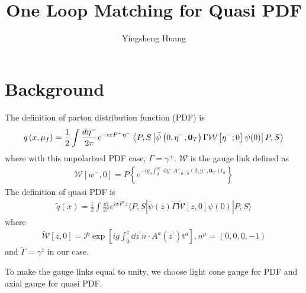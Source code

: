\documentclass{article}
\title{One Loop Matching for Quasi PDF}
\author{Yingsheng Huang}
\begin{document}
\maketitle
\section{Background}
The definition of parton distribution function (PDF) is
\begin{align}
	q\left(x, \mu_{f}\right)=\frac{1}{2} \int \frac{d \eta^{-}}{2 \pi} e^{-i x P^{+} \eta^{-}}\left\langle P, S\left|\bar{\psi}\left(0,\eta^{-},\vb{0}_{T}\right) \Gamma \mathcal{W}\left[\eta^{-} ; 0\right] \psi(0)\right| P, S\right\rangle
\end{align}
where with this unpolarized PDF case, $\Gamma=\gamma^+$. $\mathcal{W}$ is the gauge link defined as\cite{Collins2009}
\begin{align}
	\mathcal{W}\left[w^{-}, 0\right]=P\left\{e^{-i g_{0} \int_{0}^{w^{-}} \mathrm{d} y^{-} A_{(0) \sigma}^{+}\left(0, y^{-}, \boldsymbol{0}_{\mathrm{T}}\right) t_{\sigma}}\right\}
\end{align}
The definition of quasi PDF is
\begin{align}
	\tilde{q}(x)=\frac{1}{2} \int \frac{\dd z}{2 \pi} e^{i x P^{z} z}\langle P, S|\bar{\psi}(z) \tilde{\Gamma} \tilde{\mathcal{W}}[z, 0] \psi(0)| P, S\rangle
\end{align}
where
\begin{align}
	\tilde{\mathcal{W}}\left[z, 0\right]=\mathcal{P} \exp \left[i g \int_{0}^{z} \dd z^{\prime} n \cdot A^{a}\left(z^{\prime}\right) \mathrm{t}^{a}\right], n^\mu=(0,0,0,-1)
\end{align}
and $\tilde{\Gamma}=\gamma^z$ in our case.

To make the gauge links equal to unity, we choose light cone gauge for PDF and axial gauge for quasi PDF.
\end{document}
